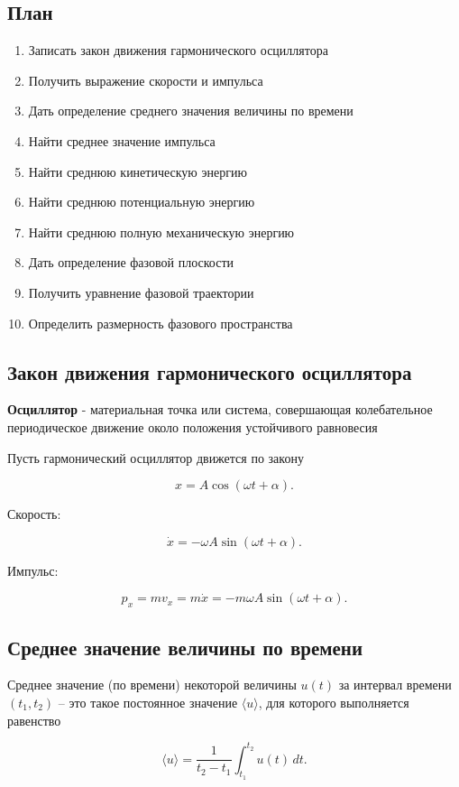 \documentclass[a4paper,12pt]{article}
\begin{document}
\subsection*{План}
\begin{enumerate}
\item Записать закон движения гармонического осциллятора
\item Получить выражение скорости и импульса
\item Дать определение среднего значения величины по времени
\item Найти среднее значение импульса
\item Найти среднюю кинетическую энергию
\item Найти среднюю потенциальную энергию
\item Найти среднюю полную механическую энергию
\item Дать определение фазовой плоскости
\item Получить уравнение фазовой траектории
\item Определить размерность фазового пространства
\end{enumerate}

\subsection*{Закон движения гармонического осциллятора}

\begin{definitionbox}
   \textbf{Осциллятор} - материальная
    точка или система, совершающая колебательное периодическое движение около положения
    устойчивого равновесия 
\end{definitionbox}
 

Пусть гармонический осциллятор движется по закону

\[
x = A \cos(\omega t + \alpha).
\]

Скорость:

\[
\dot x = - \omega A \sin(\omega t + \alpha).
\]

Импульс:

\[
p_x = m v_x = m \dot x = - m \omega A \sin(\omega t + \alpha).
\]

\subsection*{Среднее значение величины по времени}

\begin{definitionbox}
Среднее значение (по времени) некоторой величины $u(t)$ за интервал времени $(t_1,t_2)$ – это такое постоянное значение $\langle u \rangle$, для которого выполняется равенство

\[
\langle u \rangle
=
\frac{1}{t_2 - t_1}
\int_{t_1}^{t_2} u(t)\,dt.
\]
\end{definitionbox}
\end{document}
